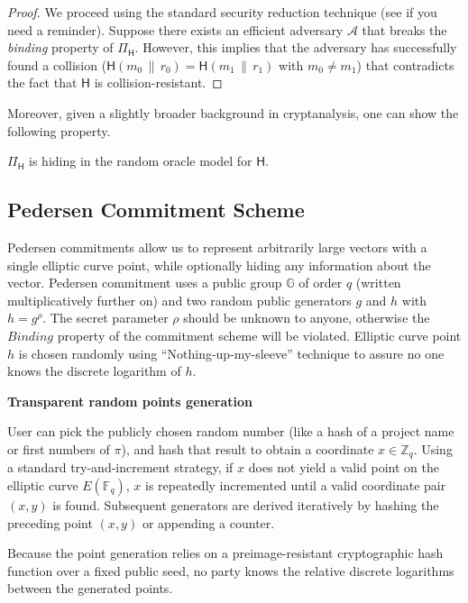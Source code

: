 \documentclass[../../book]{subfiles}
\begin{document}
\begin{proof}
    We proceed using the standard security reduction technique (see  if you need a reminder).
    Suppose there exists an efficient adversary $\mathcal{A}$ that breaks the \emph{binding} property of $\Pi_{\mathsf{H}}$.
    However, this implies that the adversary has successfully found a collision ($\mathsf{H}(m_0\,\|\, r_0) = \mathsf{H}(m_1\,\|\, r_1)$ with $m_0 \neq m_1$) that contradicts the fact that $\mathsf{H}$ is collision-resistant.
\end{proof}

Moreover, given a slightly broader background in cryptanalysis, one can show the following property.
\begin{lemma}
    $\Pi_{\mathsf{H}}$ is hiding in the random oracle model for $\mathsf{H}$.
\end{lemma}

\subsection{Pedersen Commitment Scheme}

Pedersen commitments \cite{pedersen1991} allow us to represent arbitrarily large vectors with a single elliptic curve point, while optionally hiding any information about the vector. Pedersen commitment uses a public group $\mathbb{G}$ of order $q$ (written multiplicatively further on) and two random public generators $g$ and $h$ with $h=g^{\rho}$. The secret parameter $\rho$ should be unknown to anyone, otherwise the $\textit{Binding}$ property of the commitment scheme will be violated.
Elliptic curve point $h$ is chosen randomly using ``Nothing-up-my-sleeve'' technique to assure no one knows the discrete logarithm of $h$.

\begin{remark}
    \textbf{Transparent random points generation}

    User can pick the publicly chosen random number (like a hash of a project name or first numbers of $\pi$), and hash that result to obtain a coordinate $x \in \mathbb{Z}_q$. Using a standard try-and-increment strategy, if $x$ does not yield a valid point on the elliptic curve $E(\mathbb{F}_q)$, $x$ is repeatedly incremented until a valid coordinate pair $(x, y)$ is found. Subsequent generators are derived iteratively by hashing the preceding point $(x, y)$ or appending a counter.

    Because the point generation relies on a preimage-resistant cryptographic hash function over a fixed public seed, no party knows the relative discrete logarithms between the generated points.
\end{remark}
\end{document}
